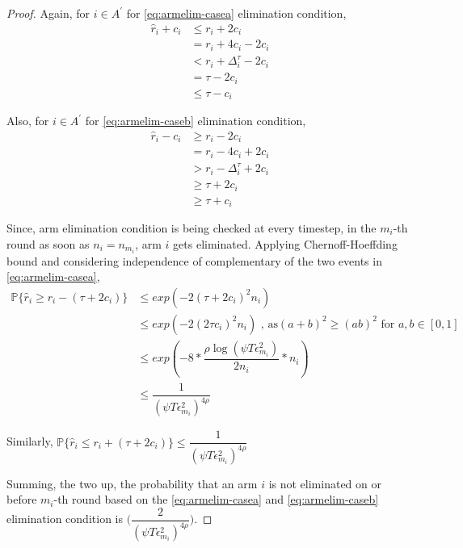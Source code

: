 \begin{proof}
Again, for ${i} \in A^{'}$ for \ref{eq:armelim-casea} elimination condition, 
\begin{align*}
\hat{r}_{i} + c_{i}&\leq r_{i} + 2c_{i} \\
&= r_{i} + 4c_{i} - 2c_{i} \\
&< r_{i} + \Delta_{i}^{\tau} - 2c_{i}\\
&= \tau -2c_{i} \\
&\leq \tau - c_{i}
\end{align*}

Also, for ${i} \in A^{'}$ for \ref{eq:armelim-caseb} elimination condition, 
\begin{align*}
\hat{r}_{i} - c_{i}&\geq r_{i} - 2c_{i} \\
&= r_{i} - 4c_{i} + 2c_{i} \\
&> r_{i} - \Delta_{i}^{\tau} + 2c_{i}\\
&\geq \tau + 2c_{i} \\
&\geq \tau + c_{i}
\end{align*}

Since, arm elimination condition is being checked at every timestep, in the $m_{i}$-th round as soon as $n_{i}=n_{m_{i}}$, arm $i$ gets eliminated. Applying Chernoff-Hoeffding bound and considering independence of complementary of the two events in \ref{eq:armelim-casea},
  \begin{align*}
\mathbb{P}\lbrace\hat{r}_{i}\geq r_{i} - (\tau + 2c_{i})\rbrace &\leq exp(-2(\tau + 2c_{i})^{2}n_{i})\\
&\leq exp(-2(2\tau c_{i})^{2}n_{i}) \text{ , as} (a+b)^{2} \geq (ab)^{2} \text{ for } a,b\in[0,1]\\
&\leq exp(-8 * \dfrac{\rho\log (\psi T\epsilon_{m_{i}}^{2})}{2 n_{i}} *n_{i})\\
&\leq \dfrac{1}{(\psi T\epsilon_{m_{i}}^{2})^{4\rho}}   
  \end{align*}
  
Similarly, $\mathbb{P}\lbrace\hat{r}_{i}\leq r_{i} + (\tau + 2c_{i})\rbrace\leq \dfrac{1}{(\psi  T\epsilon_{m_{i}}^{2})^{4\rho}}$
 
Summing, the two up, the probability that an arm ${i}$ is not eliminated on or before $m_{i}$-th round based on the \ref{eq:armelim-casea} and \ref{eq:armelim-caseb} elimination condition is  $\bigg(\dfrac{2}{(\psi T\epsilon_{m_{i}}^{2})^{4\rho}}\bigg)$. 

%


\end{proof}
